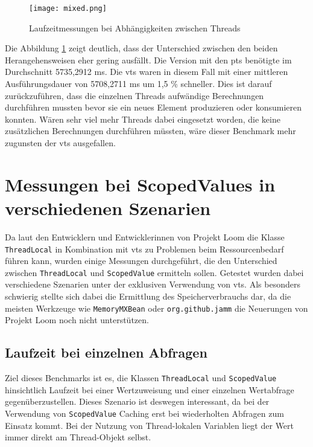     \begin{figure}[H]
        \centering
        \texttt{[image: mixed.png]}
        \caption{Laufzeitmessungen bei Abhängigkeiten zwischen Threads}
        \label{fig:mixed}
    \end{figure}

    Die Abbildung \ref{fig:mixed} zeigt deutlich, dass der Unterschied zwischen den beiden Herangehensweisen eher gering ausfällt. Die Version mit den \Glspl{pt} benötigte im Durchschnitt 5735,2912 ms. 
    Die \Glspl{vt} waren in diesem Fall mit einer mittleren Ausführungsdauer von 5708,2711 ms um 1,5 \% schneller. Dies ist darauf zurückzuführen, dass die einzelnen Threads aufwändige Berechnungen 
    durchführen mussten bevor sie ein neues Element produzieren oder konsumieren konnten. Wären sehr viel mehr Threads dabei eingesetzt worden, die keine zusätzlichen Berechnungen durchführen müssten, wäre 
    dieser Benchmark mehr zugunsten der \Glspl{vt} ausgefallen.
    
\section{Messungen bei ScopedValues in verschiedenen Szenarien}
\label{sec:MessungenbeiScopedValuesinverschiedenenSzenarien}

    Da laut den Entwicklern und Entwicklerinnen von Projekt Loom die Klasse \texttt{ThreadLocal} in Kombination mit \Glspl{vt} zu Problemen beim Ressourcenbedarf führen kann, 
    wurden einige Messungen durchgeführt, die den Unterschied zwischen \texttt{ThreadLocal} und \texttt{Scoped\-Value} ermitteln sollen. Getestet wurden dabei verschiedene Szenarien
    unter der exklusiven Verwendung von \Glspl{vt}. 
    Als besonders schwierig stellte sich dabei die Ermittlung des Speicherverbrauchs dar, da die meisten Werkzeuge wie \texttt{MemoryMXBean} oder \texttt{org.github.jamm} die Neuerungen von 
    Projekt Loom noch nicht unterstützen.

\subsection{Laufzeit bei einzelnen Abfragen}
\label{sec:LaufzeitbeieinzelnenAbfragen}
    
    Ziel dieses Benchmarks ist es, die Klassen \texttt{ThreadLocal} und \texttt{ScopedValue} hinsichtlich Laufzeit bei einer Wertzuweisung und einer einzelnen Wertabfrage gegenüberzustellen.
    Dieses Szenario ist deswegen interessant, da bei der Verwendung von \texttt{ScopedValue} Caching erst bei wiederholten Abfragen zum Einsatz kommt. Bei der Nutzung von Thread-lokalen Variablen
    liegt der Wert immer direkt am Thread-Objekt selbst. 

